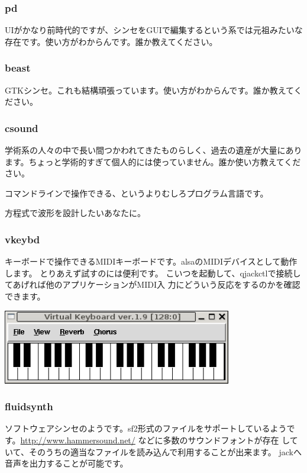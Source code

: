 \documentclass[mingoth,a4paper]{jsarticle}
\begin{document}
\subsubsection{pd}

UIがかなり前時代的ですが、シンセをGUIで編集するという系では元祖みたいな
存在です。使い方がわからんです。誰か教えてください。

\subsubsection{beast}

GTKシンセ。これも結構頑張っています。使い方がわからんです。誰か教えてください。

\subsubsection{csound}

学術系の人々の中で長い間つかわれてきたものらしく、過去の遺産が大量にあり
ます。ちょっと学術的すぎて個人的には使っていません。誰か使い方教えてくだ
さい。

コマンドラインで操作できる、というよりむしろプログラム言語です。

方程式で波形を設計したいあなたに。

\subsubsection{vkeybd}

キーボードで操作できるMIDIキーボードです。alsaのMIDIデバイスとして動作します。
とりあえず試すのには便利です。
こいつを起動して、qjackctlで接続してあげれば他のアプリケーションがMIDI入
力にどういう反応をするのかを確認できます。

\includegraphics[width=10cm]{image200602/vkeybd.png}

\subsubsection{fluidsynth}

ソフトウェアシンセのようです。sf2形式のファイルをサポートしているようで
す。\url{http://www.hammersound.net/} などに多数のサウンドフォントが存在
していて、そのうちの適当なファイルを読み込んで利用することが出来ます。
jackへ音声を出力することが可能です。
\end{document}
